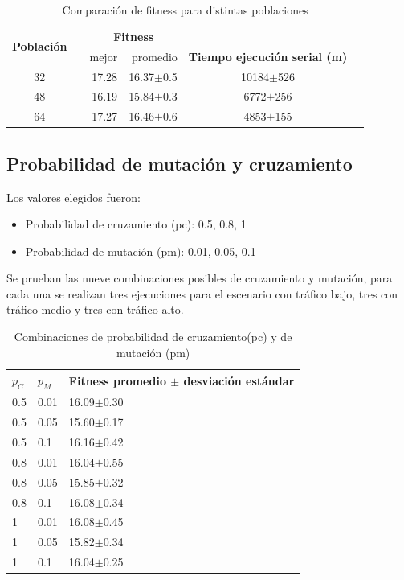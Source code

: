 \begin{table}[h]
	\renewcommand{\arraystretch}{1.2}
	\caption{Comparación de fitness para distintas poblaciones}
	\label{table:parametro_poblacion}
	\centering
	\begin{tabular}{ccrrcp{2cm}}
		\hline
	    \multirow{2}{*}{\textbf{Población}}& & 
		\multicolumn{2}{c}{\textbf{Fitness}} \\
		\cline{3-4}
		& & {mejor} 
		& {promedio} 
		& \textbf{Tiempo ejecución serial (m)} \\
		\hline
		32 & & {17.28} & 16.37$\pm$0.5 & 10184$\pm$526\\
		48 & & {16.19} & 15.84$\pm$0.3 & 6772$\pm$256\\
		64 & & {17.27} & 16.46$\pm$0.6 & 4853$\pm$155\\
		\hline
	\end{tabular}
\end{table}





\subsection{Probabilidad de mutación y cruzamiento}

Los valores elegidos fueron:

\begin{itemize}
	\item Probabilidad de cruzamiento (pc):  0.5, 0.8, 1
	\item Probabilidad de  mutación (pm):  0.01, 0.05, 0.1
\end{itemize}

Se prueban las nueve combinaciones posibles de cruzamiento y mutación, para cada una se realizan tres ejecuciones para el escenario con tráfico bajo, tres con tráfico medio y tres con tráfico alto.

 
 \begin{table}[H]
 	\renewcommand{\arraystretch}{1.2}
 	\caption{Combinaciones de probabilidad de cruzamiento(pc) y de mutación (pm)}
 	\label{table:parametro_mutacion_cruzamiento}
 	\centering
 	\begin{tabular}{p{1cm}p{1cm}p{3.5cm} }
 		\hline
 		$p_C$& 
 		$p_M$ & 
 		Fitness promedio  $\pm$ desviación estándar\\ 
 		\hline
 		0.5 & 0.01  &  16.09$\pm$0.30\\
 		0.5 & 0.05 &  15.60$\pm$0.17\\
 		0.5 & 0.1  &  16.16$\pm$0.42\\
 		0.8 & 0.01  &  16.04$\pm$0.55\\
 		0.8 & 0.05  &  15.85$\pm$0.32\\
 		0.8 & 0.1  &  16.08$\pm$0.34\\
 		1 & 0.01 &  16.08$\pm$0.45\\
 		1 & 0.05 &  15.82$\pm$0.34\\
 		1 & 0.1 &  16.04$\pm$0.25\\
 		\hline
 	\end{tabular}
 \end{table}
 
